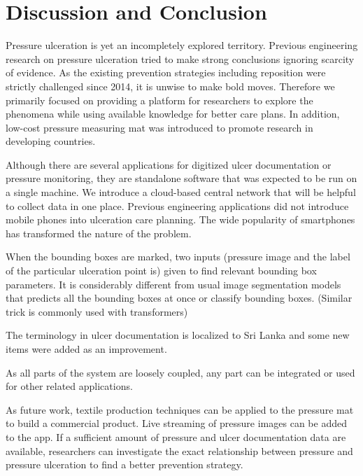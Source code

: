 \chapter{Discussion and Conclusion}

Pressure ulceration is yet an incompletely explored territory. Previous engineering research on pressure ulceration tried to make strong conclusions ignoring scarcity of evidence. As the existing prevention strategies including reposition were strictly challenged since 2014, it is unwise to make bold moves. Therefore we primarily focused on providing a platform for researchers to explore the phenomena while using available knowledge for better care plans. In addition, low-cost pressure measuring mat was introduced to promote research in developing countries. 

Although there are several applications for digitized ulcer documentation or pressure monitoring, they are standalone software that was expected to be run on a single machine. We introduce a cloud-based central network that will be helpful to collect data in one place. Previous engineering applications did not introduce mobile phones into ulceration care planning. The wide popularity of smartphones has transformed the nature of the problem. 

When the bounding boxes are marked, two inputs (pressure image and the label of the particular ulceration point is) given to find relevant bounding box parameters. It is considerably different from usual image segmentation models that predicts all the bounding boxes at once or classify bounding boxes. (Similar trick is commonly used with transformers) 

The terminology in ulcer documentation is localized to Sri Lanka and some new items were added as an improvement.

As all parts of the system are loosely coupled, any part can be integrated or used for other related applications.

As future work, textile production techniques can be applied to the pressure mat to build a commercial product. Live streaming of pressure images can be added to the app. If a sufficient amount of pressure and ulcer documentation data are available, researchers can investigate the exact relationship between pressure and pressure ulceration to find a better prevention strategy.



